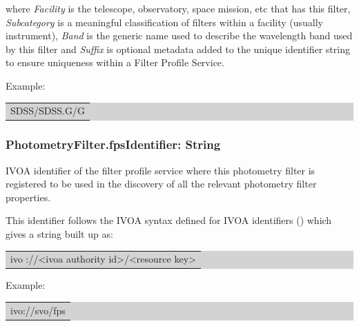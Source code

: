 \documentclass[11pt,a4paper]{ivoa}
\begin{document}

where \textit{Facility} is the telescope, observatory, space mission, etc that has this filter, \textit{Subcategory} is a meaningful classification of filters within a facility (usually instrument), \textit{Band} is the generic name used to describe the wavelength band used by this filter and \textit{Suffix} is optional metadata added to the unique identifier string to ensure uniqueness within a Filter Profile Service.
\par

Example:
\par


\bigskip
\begingroup\setlength{\fboxsep}{0pt}
\colorbox{lightgray}{%
\begin{tabular}{|p{5.53in}|}
SDSS/SDSS.G/G
\end{tabular}%
}\endgroup
\par
\bigskip


\subsubsection{PhotometryFilter.fpsIdentifier: String}
IVOA identifier of the filter profile service where this photometry filter is registered to be used in the discovery of all the relevant photometry filter properties.
\par

This identifier follows the IVOA syntax defined for IVOA identifiers (\citep{plante}) which gives a string built up as:
\par

\bigskip
\begingroup\setlength{\fboxsep}{0pt}
\colorbox{lightgray}{%
\begin{tabular}{|p{5.53in}|}
ivo ://<ivoa authority id>/<resource key>
\end{tabular}%
}\endgroup
\par
\bigskip




Example:
\par

\bigskip
\begingroup\setlength{\fboxsep}{0pt}
\colorbox{lightgray}{%
\begin{tabular}{|p{5.53in}|}
ivo://svo/fps
\end{tabular}%
}\endgroup
\par
\bigskip
\end{document}
